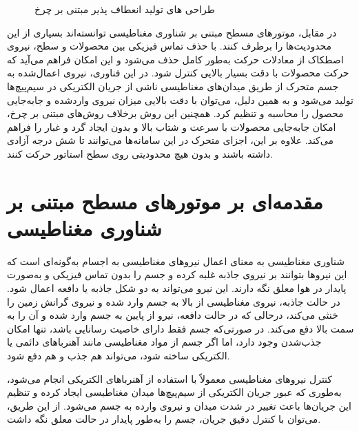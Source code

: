 \begin{figure}[ht]
\centering 
{}
%
\caption{طراحی های تولید انعطاف پذیر مبتنی بر چرخ}
\label{fig:flexiblewheel} %
\end{figure}
در مقابل، موتورهای مسطح مبتنی‌ بر شناوری مغناطیسی
 توانسته‌اند بسیاری از این محدودیت‌ها را برطرف کنند. با حذف تماس فیزیکی بین محصولات و سطح، نیروی اصطکاک از معادلات حرکت به‌طور کامل حذف می‌شود و این امکان فراهم می‌آید که حرکت محصولات با دقت بسیار بالایی کنترل شود. در این فناوری، نیروی اعمال‌شده به جسم متحرک از طریق میدان‌های مغناطیسی ناشی از جریان الکتریکی در سیم‌پیچ‌ها تولید می‌شود و به همین دلیل، می‌توان با دقت بالایی میزان نیروی واردشده و جابه‌جایی محصول را محاسبه و تنظیم کرد. همچنین این روش برخلاف روش‌های مبتنی‌ بر چرخ، امکان جابه‌جایی محصولات با سرعت و شتاب بالا و بدون ایجاد گرد و غبار را فراهم می‌کند. علاوه‌ بر این، اجزای متحرک در این سامانه‌ها می‌توانند تا شش درجه آزادی داشته باشند و بدون هیچ محدودیتی روی سطح استاتور حرکت کنند.



\section{مقدمه‌ای بر موتورهای مسطح مبتنی‌ بر شناوری مغناطیسی}

شناوری مغناطیسی به معنای اعمال نیروهای مغناطیسی به اجسام به‌گونه‌ای است که این نیروها بتوانند بر نیروی جاذبه غلبه کرده و جسم را بدون تماس فیزیکی و به‌صورت پایدار در هوا معلق نگه ‌دارند. این نیرو می‌تواند به دو شکل جاذبه یا دافعه اعمال شود. در حالت جاذبه‌، نیروی مغناطیسی از بالا به جسم وارد شده و نیروی گرانش زمین را خنثی می‌کند، درحالی‌ که در حالت دافعه، نیرو از پایین به جسم وارد شده و آن را به سمت بالا دفع می‌کند. در صورتی‌که جسم فقط دارای خاصیت رسانایی باشد، تنها امکان جذب‌شدن وجود دارد، اما اگر جسم از مواد مغناطیسی مانند آهنرباهای دائمی یا الکتریکی ساخته شود، می‌تواند هم جذب و هم دفع شود.

کنترل نیروهای مغناطیسی معمولاً با استفاده از آهنرباهای الکتریکی انجام می‌شود، به‌طوری ‌که عبور جریان الکتریکی از سیم‌پیچ‌ها میدان مغناطیسی ایجاد کرده و تنظیم این جریان‌ها باعث تغییر در شدت میدان و نیروی وارده به جسم می‌شود. از این طریق، می‌توان با کنترل دقیق جریان، جسم را به‌طور پایدار در حالت معلق نگه داشت.

